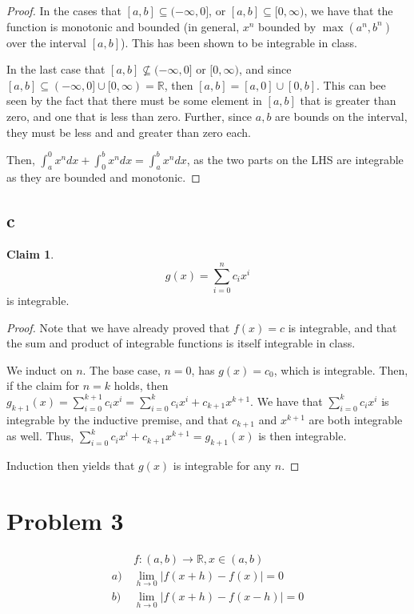 \documentclass[12pt,letterpaper]{article}
\theoremstyle{definition}
\newtheorem*{claim}{Claim}
\newcommand{\R}{\mathbb{R}}
\begin{document}
\begin{proof}
  In the cases that $[a,b] \subseteq(-\infty, 0]$, or $[a,b] \subseteq[0,\infty)$, we have
  that the function is monotonic and bounded (in general, $x^n$ bounded by
  $\max(a^n,b^n)$ over the interval $[a,b]$). This has been shown to be integrable
  in class.

  In the last case that $[a,b] \nsubseteq (-\infty, 0]$ or $[0,\infty)$, and since
  $ [a,b] \subseteq (-\infty, 0] \cup [0,\infty) = \R$, then $[a,b] = [a,0] \cup
  [0,b]$. This can bee seen by the fact that there must be some element in $[a,b]$
  that is greater than zero, and one that is less than zero. Further, since $a,b$
  are bounds on the interval, they must be less and and greater than zero each.

  Then, $\int_a^0x^ndx + \int_0^bx^ndx = \int_a^bx^ndx$, as the two parts on the
  LHS are integrable as they are bounded and monotonic.
\end{proof}

\subsection*{c}

\begin{claim}
  \[
    g(x) = \sum_{i=0}^nc_ix^i 
  \]
  is integrable.
\end{claim}

\begin{proof}
  Note that we have already proved that $f(x) = c$ is integrable, and that the
  sum and product of integrable functions is itself integrable in class.

  We induct on $n$. The base case, $n = 0$, has $g(x) = c_0$, which is
  integrable. Then, if the claim for $n = k$ holds, then $g_{k+1}(x) =
  \sum_{i=0}^{k+1}c_ix^i = \sum_{i=0}^kc_ix^i + c_{k+1}x^{k+1}$. We have that
  $\sum_{i=0}^kc_ix^i$ is integrable by the inductive premise, and that $c_{k+1}$
  and $x^{k+1}$ are both integrable as well. Thus, $ \sum_{i=0}^kc_ix^i +
  c_{k+1}x^{k+1} = g_{k+1}(x)$ is then integrable.

  Induction then yields that $g(x)$ is integrable for any $n$.
\end{proof}


\section*{Problem 3}

\begin{align*}
  &f:(a,b) \rightarrow \R, x \in (a,b) \\
  a) \ &\lim_{h\rightarrow 0}|f(x + h) - f(x)| = 0 \\
  b) \ &\lim_{h\rightarrow 0}|f(x + h) - f(x - h)| = 0
\end{align*}
\end{document}
